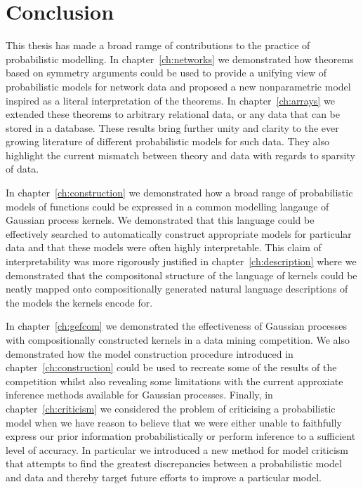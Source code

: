 
\inbpdocument

\chapter{Conclusion}
\label{ch:conclusion}

This thesis has made a broad ramge of contributions to the practice of probabilistic modelling.
In chapter~\ref{ch:networks} we demonstrated how theorems based on symmetry arguments could be used to provide a unifying view of probabilistic models for network data and proposed a new nonparametric model inspired as a literal interpretation of the theorems.
In chapter~\ref{ch:arrays} we extended these theorems to arbitrary relational data, or any data that can be stored in a database.
These results bring further unity and clarity to the ever growing literature of different probabilistic models for such data.
They also highlight the current mismatch between theory and data with regards to sparsity of data.

In chapter~\ref{ch:construction} we demonstrated how a broad range of probabilistic models of functions could be expressed in a common modelling langauge of Gaussian process kernels.
We demonstrated that this language could be effectively searched to automatically construct appropriate models for particular data and that these models were often highly interpretable.
This claim of interpretability was more rigorously justified in chapter~\ref{ch:description} where we demonstrated that the compositonal structure of the language of kernels could be neatly mapped onto compositionally generated natural language descriptions of the models the kernels encode for.

In chapter~\ref{ch:gefcom} we demonstrated the effectiveness of Gaussian processes with compositionally constructed kernels in a data mining competition.
We also demonstrated how the model construction procedure introduced in chapter~\ref{ch:construction} could be used to recreate some of the results of the competition whilst also revealing some limitations with the current approxiate inference methods available for Gaussian processes.
Finally, in chapter~\ref{ch:criticism} we considered the problem of criticising a probabilistic model when we have reason to believe that we were either unable to faithfully express our prior information probabilistically or perform inference to a sufficient level of accuracy.
In particular we introduced a new method for model criticism that attempts to find the greatest discrepancies between a probabilistic model and data and thereby target future efforts to improve a particular model.

\outbpdocument{


}
